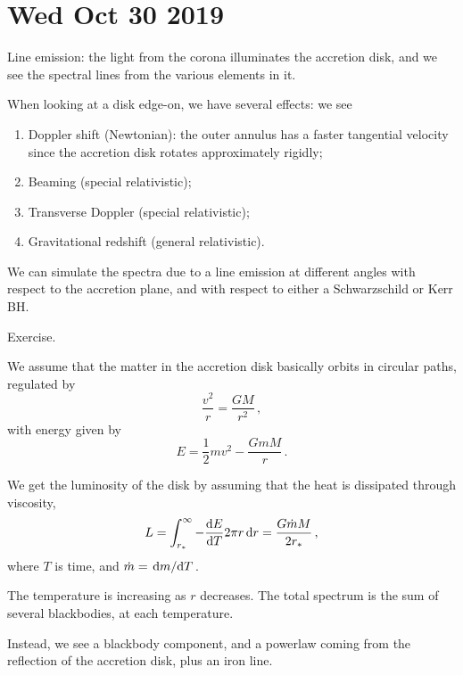 \documentclass[main.tex]{subfiles}
\begin{document}
\section*{Wed Oct 30 2019}

Line emission: the light from the corona illuminates the accretion disk, and we see the spectral lines from the various elements in it.

When looking at a disk edge-on, we have several effects: we see
\begin{enumerate}
    \item Doppler shift (Newtonian): the outer annulus has a faster tangential velocity since the accretion disk rotates approximately rigidly;
    \item Beaming (special relativistic);
    \item Transverse Doppler (special relativistic);
    \item Gravitational redshift (general relativistic).
\end{enumerate}

We can simulate the spectra due to a line emission at different angles with respect to the accretion plane, and with respect to either a Schwarzschild or Kerr BH.

Exercise.

We assume that the matter in the accretion disk basically orbits in circular paths, regulated by 
%
\begin{equation}
  \frac{v^2}{r} = \frac{GM}{r^2}
\,,
\end{equation}
%
with energy given by 
%
\begin{equation}
  E = \frac{1}{2} m v^2 - \frac{GmM}{r}
\,.
\end{equation}

We get the luminosity of the disk by assuming that the heat is dissipated through viscosity, 
%
\begin{equation}
  L = \int _{r_{*}}^{\infty} - \dv{E}{T} 2 \pi r \dd{r} = \frac{G \dot{m} M}{2 r_{*}}
\,,
\end{equation}
%
where \(T\) is time, and \(\dot{m} = \dv*{m}{T}\).

The temperature is increasing as \(r\) decreases. The total spectrum is the sum of several blackbodies, at each temperature.

Instead, we see a blackbody component, and a powerlaw coming from the reflection of the accretion disk, plus an iron line.
\end{document}
